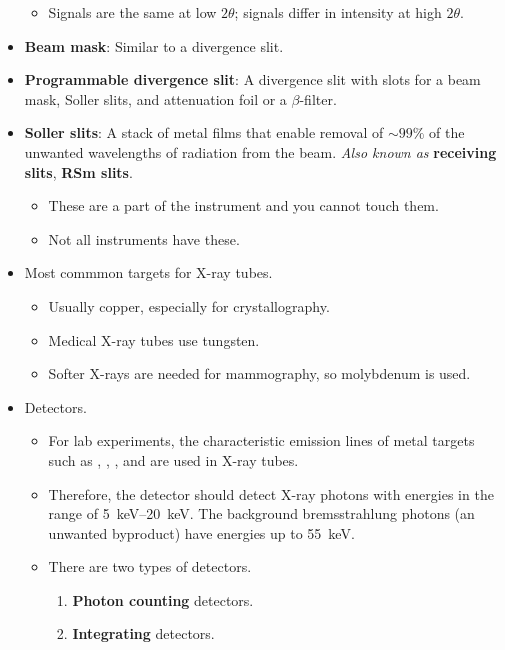 \documentclass[../notes.tex]{subfiles}
\begin{document}
\begin{itemize}
\begin{itemize}
        \item Signals are the same at low $2\theta$; signals differ in intensity at high $2\theta$.
    \end{itemize}
    \item \textbf{Beam mask}: Similar to a divergence slit.
    \item \textbf{Programmable divergence slit}: A divergence slit with slots for a beam mask, Soller slits, and attenuation foil or a $\beta$-filter.
    \item \textbf{Soller slits}: A stack of metal films that enable removal of $\sim 99\%$ of the unwanted wavelengths of radiation from the beam. \emph{Also known as} \textbf{receiving slits}, \textbf{RSm slits}.
    \begin{itemize}
        \item These are a part of the instrument and you cannot touch them.
        \item Not all instruments have these.
    \end{itemize}
    \item Most commmon targets for X-ray tubes.
    \begin{itemize}
        \item Usually copper, especially for crystallography.
        \item Medical X-ray tubes use tungsten.
        \item Softer X-rays are needed for mammography, so molybdenum is used.
    \end{itemize}
    \item Detectors.
    \begin{itemize}
        \item For lab experiments, the characteristic emission lines of metal targets such as , , , and  are used in X-ray tubes.
        \item Therefore, the detector should detect X-ray photons with energies in the range of \SIrange{5}{20}{\kilo\electronvolt}. The background bremsstrahlung photons (an unwanted byproduct) have energies up to \SI{55}{\kilo\electronvolt}.
        \item There are two types of detectors.
        \begin{enumerate}[label={(\roman*)}]
            \item \textbf{Photon counting} detectors.
            \item \textbf{Integrating} detectors.
        \end{enumerate}

\end{itemize}
\end{itemize}
\end{document}
